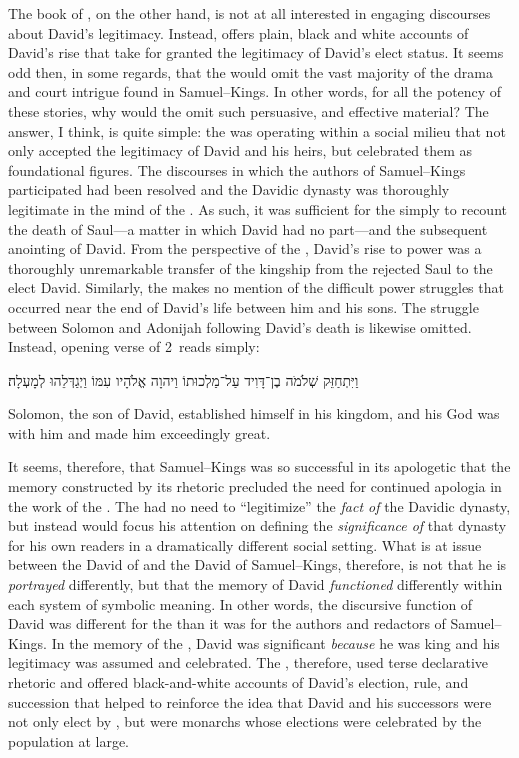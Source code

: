 The book of \chronicles, on the other hand, is not at all interested in engaging discourses about David's legitimacy. Instead, \chronicles offers plain, black and white accounts of David's rise that take for granted the legitimacy of David's elect status. It seems odd then, in some regards, that the \chronicler would omit the vast majority of the drama and court intrigue found in Samuel--Kings. In other words, for all the potency of these stories, why would the \chronicler omit such persuasive, and effective material? The answer, I think, is quite simple: the \chronicler was operating within a social milieu that not only accepted the legitimacy of David and his heirs, but celebrated them as foundational figures. The discourses in which the authors of Samuel--Kings participated had been resolved and the Davidic dynasty was thoroughly legitimate in the mind of the \chronicler. As such, it was sufficient for the \chronicler simply to recount the death of Saul---a matter in which David had no part---and the subsequent anointing of David. From the perspective of the \chronicler, David's rise to power was a thoroughly unremarkable transfer of the kingship from the rejected Saul to the elect David. Similarly, the \chronicler makes no mention of the difficult power struggles that occurred near the end of David's life between him and his sons. The struggle between Solomon and Adonijah following David's death is likewise omitted. Instead, opening verse of 2~\chronicles reads simply:
    \begin{hebrewtext}
        וַיִּתְחַזֵּק שְׁלֹמֹה בֶן־דָּוִיד עַל־מַלְכוּתוֹ וַיהוָה אֱלֹהָיו עִמּוֹ וַיְגַדְּלֵהוּ לְמָעְלָה׃
    \end{hebrewtext}
    \begin{translation}
        Solomon, the son of David, established himself in his kingdom, and \yahweh his God was with him and made him exceedingly great.   
    \end{translation}
\noindent
It seems, therefore, that Samuel--Kings was so successful in its apologetic that the memory constructed by its rhetoric precluded the need for continued apologia in the work of the \chronicler. The \chronicler had no need to ``legitimize'' the \emph{fact of} the Davidic dynasty, but instead would focus his attention on defining the \emph{significance of} that dynasty for his own readers in a dramatically different social setting. What is at issue between the David of \chronicles and the David of Samuel--Kings, therefore, is not that he is \emph{portrayed} differently, but that the memory of David \emph{functioned} differently within each system of symbolic meaning. In other words, the discursive function of David was different for the \chronicler than it was for the authors and redactors of Samuel--Kings. In the memory of the \chronicler, David was significant \emph{because} he was king and his legitimacy was assumed and celebrated. The \chronicler, therefore, used terse declarative rhetoric and offered black-and-white accounts of David's election, rule, and succession that helped to reinforce the idea that David and his successors were not only elect by \yahweh, but were monarchs whose elections were celebrated by the population at large.

